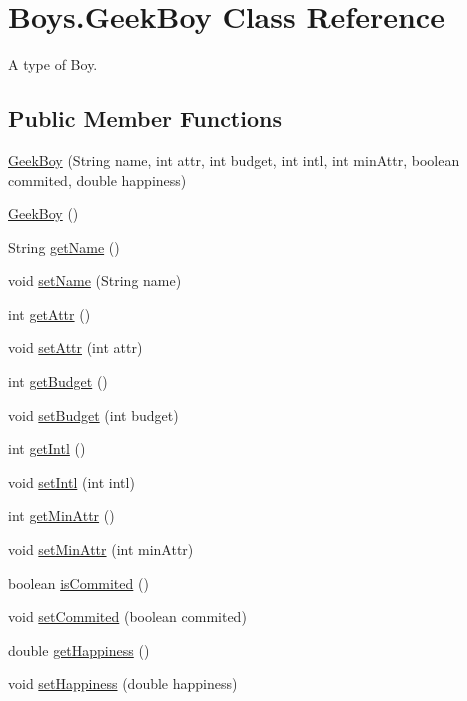 \hypertarget{class_boys_1_1_geek_boy}{}\section{Boys.\+Geek\+Boy Class Reference}
\label{class_boys_1_1_geek_boy}


A type of Boy.  


\subsection*{Public Member Functions}
\begin{DoxyCompactItemize}
\item 
\hyperlink{class_boys_1_1_geek_boy_af4cd91eca301401560b4fea07a555446}{Geek\+Boy} (String name, int attr, int budget, int intl, int min\+Attr, boolean commited, double happiness)
\item 
\hyperlink{class_boys_1_1_geek_boy_a94ce2920fde16a726f93c8ed371a6076}{Geek\+Boy} ()
\item 
String \hyperlink{class_boys_1_1_geek_boy_a8e4a71f51ec8a010d3497fb665499134}{get\+Name} ()
\item 
void \hyperlink{class_boys_1_1_geek_boy_a4ad29814d3ee6743e28b09f281f5bca2}{set\+Name} (String name)
\item 
int \hyperlink{class_boys_1_1_geek_boy_ad52b4fd950d0b9ff44315fedfba7ef55}{get\+Attr} ()
\item 
void \hyperlink{class_boys_1_1_geek_boy_a2dcd1f35854d1ebb3f469a1b611b0d15}{set\+Attr} (int attr)
\item 
int \hyperlink{class_boys_1_1_geek_boy_a606fcc046649afa5907fd00e9c301ec2}{get\+Budget} ()
\item 
void \hyperlink{class_boys_1_1_geek_boy_af04055d5235ee70a494fbe6d45b6bd6e}{set\+Budget} (int budget)
\item 
int \hyperlink{class_boys_1_1_geek_boy_adb53c1f4daa5a5254ce1558a795fb7a0}{get\+Intl} ()
\item 
void \hyperlink{class_boys_1_1_geek_boy_a62be6e4824a7e65b95d2e8d4aebc9e3d}{set\+Intl} (int intl)
\item 
int \hyperlink{class_boys_1_1_geek_boy_aa4156000adebc076f01c3a4fb01bf4e4}{get\+Min\+Attr} ()
\item 
void \hyperlink{class_boys_1_1_geek_boy_a8868876f26dd6bf4278b470710f22d63}{set\+Min\+Attr} (int min\+Attr)
\item 
boolean \hyperlink{class_boys_1_1_geek_boy_a36b2502d25e7a47c655e32a61ce45521}{is\+Commited} ()
\item 
void \hyperlink{class_boys_1_1_geek_boy_a9a77de09bce8d3764673a37d6df7a5e6}{set\+Commited} (boolean commited)
\item 
double \hyperlink{class_boys_1_1_geek_boy_ab11181055780cbb6730babf6be96942b}{get\+Happiness} ()
\item 
void \hyperlink{class_boys_1_1_geek_boy_a46cb7cb2796b75c4fae17512610cf6c8}{set\+Happiness} (double happiness)
\end{DoxyCompactItemize}
